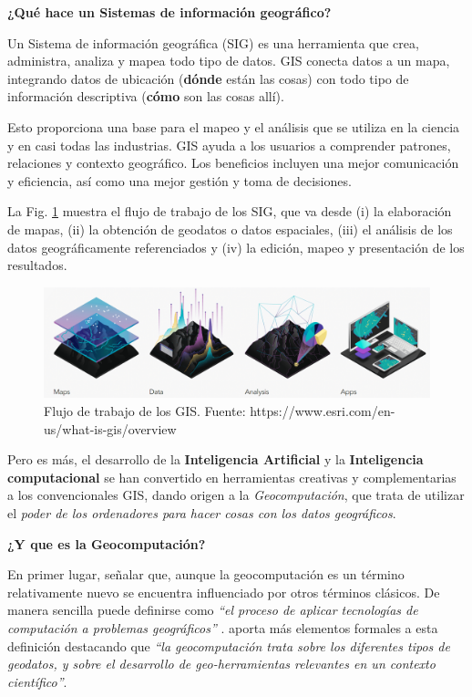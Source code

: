 \documentclass[
]{report}
\theoremstyle{definition}
\theoremstyle{definition}
\theoremstyle{definition}
\theoremstyle{definition}
\theoremstyle{remark}
\begin{document}
\textbf{¿Qué hace un Sistemas de información geográfico?}

Un Sistema de información geográfica (SIG) es una herramienta que crea,
administra, analiza y mapea todo tipo de datos. GIS conecta datos a un mapa,
integrando datos de ubicación (\textbf{dónde} están las cosas) con todo tipo de
información descriptiva (\textbf{cómo} son las cosas allí).

Esto proporciona una base para el mapeo y el análisis que se utiliza en la
ciencia y en casi todas las industrias. GIS ayuda a los usuarios a comprender
patrones, relaciones y contexto geográfico. Los beneficios incluyen una mejor
comunicación y eficiencia, así como una mejor gestión y toma de decisiones.

La Fig. \ref{fig:gisflujo} muestra el flujo de trabajo de los SIG, que va desde
(i) la elaboración de mapas, (ii) la obtención de geodatos o datos espaciales,
(iii) el análisis de los datos geográficamente referenciados y (iv) la edición,
mapeo y presentación de los resultados.

\begin{figure}

{\centering \includegraphics[width=0.7\linewidth]{img/GIS} 

}

\caption{Flujo de trabajo de los GIS. Fuente: https://www.esri.com/en-us/what-is-gis/overview}\label{fig:gisflujo}
\end{figure}

Pero es más, el desarrollo de la \textbf{Inteligencia Artificial} y la \textbf{Inteligencia
computacional} se han convertido en herramientas creativas y complementarias a
los convencionales GIS, dando origen a la \emph{Geocomputación}, que trata de
utilizar el \emph{poder de los ordenadores para hacer cosas con los datos
geográficos}.

\textbf{¿Y que es la Geocomputación?}

En primer lugar, señalar que, aunque la geocomputación es un término
relativamente nuevo se encuentra influenciado por otros términos clásicos. De
manera sencilla puede definirse como \emph{``el proceso de aplicar tecnologías de
computación a problemas geográficos''} \citep{rees1998}. \citet{Openshaw_Abrahart_2000}
aporta más elementos formales a esta definición destacando que \emph{``la
geocomputación trata sobre los diferentes tipos de geodatos, y sobre el
desarrollo de geo-herramientas relevantes en un contexto científico''}.
\end{document}
